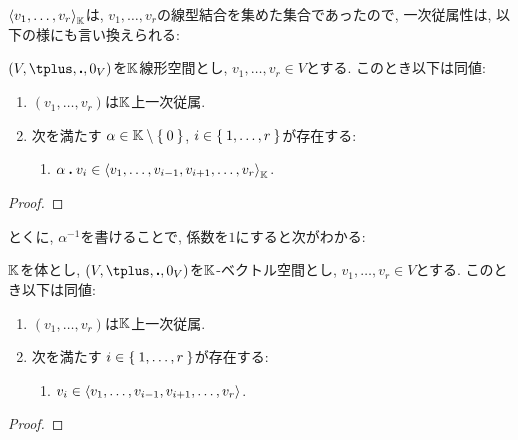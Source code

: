 $\Braket{v_1,\ldots,v_r}_{\mathbb{K}}$は,
$v_1,\ldots,v_r$の線型結合を集めた集合であったので,
一次従属性は, 以下の様にも言い換えられる:
\begin{lemma}
  $(V,\plus,\act,0_V)$を$\mathbb{K}$線形空間とし,
  $v_1,\ldots,v_r\in V$とする.
  このとき以下は同値:
  \begin{enumerate}
  \item
  $(v_1,\ldots,v_r)$は$\mathbb{K}$上一次従属.
  \item
  次を満たす
  $\alpha\in\mathbb{K}\setminus\Set{0}$, $i\in\Set{1,\ldots,r}$が存在する:
  \begin{enumerate}
  \item $\alpha\mathbin{\boldsymbol{.}} v_i \in \Braket{v_1,\ldots,v_{i-1},v_{i+1},\ldots,v_{r}}_{\mathbb{K}}$.
  \end{enumerate}
  \end{enumerate}
\end{lemma}
\begin{proof}\end{proof}
とくに, $\alpha^{-1}$を書けることで,
係数を$1$にすると次がわかる:
\begin{prop}
 $\mathbb{K}$を体とし,
  $(V,\plus,\act,0_V)$を$\mathbb{K}$-ベクトル空間とし,
  $v_1,\ldots,v_r\in V$とする.
  このとき以下は同値:
  \begin{enumerate}
  \item $(v_1,\ldots,v_r)$は$\mathbb{K}$上一次従属.
  \item
  次を満たす
  $i\in\Set{1,\ldots,r}$が存在する:
  \begin{enumerate}
  \item $v_i \in \Braket{v_1,\ldots,v_{i-1},v_{i+1},\ldots,v_{r}}$.
  \end{enumerate}
  \end{enumerate}
\end{prop}
\begin{proof}\end{proof}


